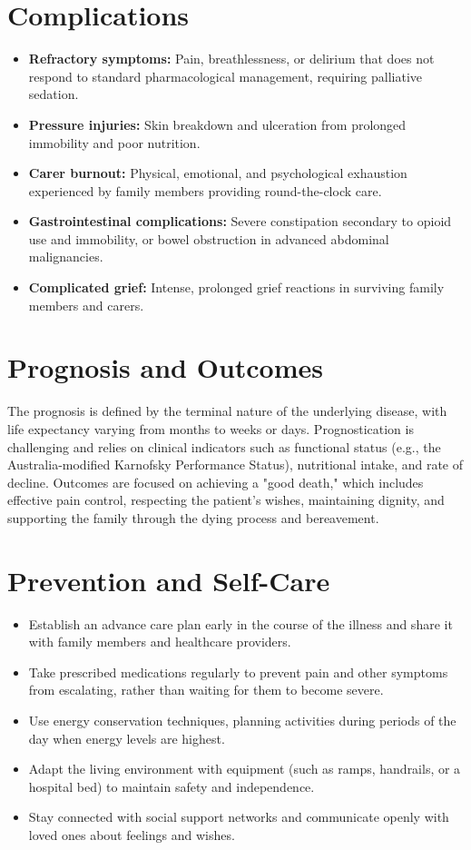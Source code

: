 \section*{Complications}
\begin{itemize}
    \item \textbf{Refractory symptoms:} Pain, breathlessness, or delirium that does not respond to standard pharmacological management, requiring palliative sedation.
    \item \textbf{Pressure injuries:} Skin breakdown and ulceration from prolonged immobility and poor nutrition.
    \item \textbf{Carer burnout:} Physical, emotional, and psychological exhaustion experienced by family members providing round-the-clock care.
    \item \textbf{Gastrointestinal complications:} Severe constipation secondary to opioid use and immobility, or bowel obstruction in advanced abdominal malignancies.
    \item \textbf{Complicated grief:} Intense, prolonged grief reactions in surviving family members and carers.
\end{itemize}

\section*{Prognosis and Outcomes}
The prognosis is defined by the terminal nature of the underlying disease, with life expectancy varying from months to weeks or days. Prognostication is challenging and relies on clinical indicators such as functional status (e.g., the Australia-modified Karnofsky Performance Status), nutritional intake, and rate of decline. Outcomes are focused on achieving a "good death," which includes effective pain control, respecting the patient's wishes, maintaining dignity, and supporting the family through the dying process and bereavement.

\section*{Prevention and Self-Care}
\begin{itemize}
    \item Establish an advance care plan early in the course of the illness and share it with family members and healthcare providers.
    \item Take prescribed medications regularly to prevent pain and other symptoms from escalating, rather than waiting for them to become severe.
    \item Use energy conservation techniques, planning activities during periods of the day when energy levels are highest.
    \item Adapt the living environment with equipment (such as ramps, handrails, or a hospital bed) to maintain safety and independence.
    \item Stay connected with social support networks and communicate openly with loved ones about feelings and wishes.
\end{itemize}

